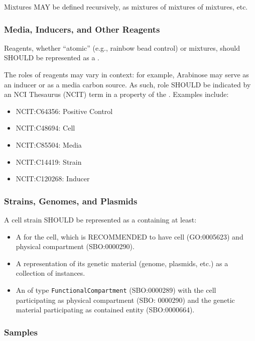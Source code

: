 Mixtures MAY be defined recursively, as mixtures of mixtures of mixtures, etc.

\subsubsection{Media, Inducers, and Other Reagents}

Reagents, whether ``atomic'' (e.g., rainbow bead control) or mixtures, should SHOULD be represented as a .

The roles of reagents may vary in context: for example, Arabinose may serve as an inducer or as a media carbon source. As such, role SHOULD be indicated by an NCI Thesaurus (NCIT) term in a  property of the . Examples include:
\begin{itemize}
\item NCIT:C64356: Positive Control
\item NCIT:C48694: Cell
\item NCIT:C85504: Media
\item NCIT:C14419: Strain
\item NCIT:C120268: Inducer
\end{itemize}

\subsubsection{Strains, Genomes, and Plasmids}

A cell strain SHOULD be represented as a  containing at least:
\begin{itemize}
\item A  for the cell, which is RECOMMENDED to have  cell (GO:0005623) and  physical compartment (SBO:0000290).
\item A representation of its genetic material (genome, plasmids, etc.) as a collection of  instances.
\item An  of type \texttt{FunctionalCompartment} (SBO:0000289) with the cell participating as physical compartment (SBO: 0000290) and the genetic material participating as contained entity (SBO:0000664).
\end{itemize}

\subsubsection{Samples}


